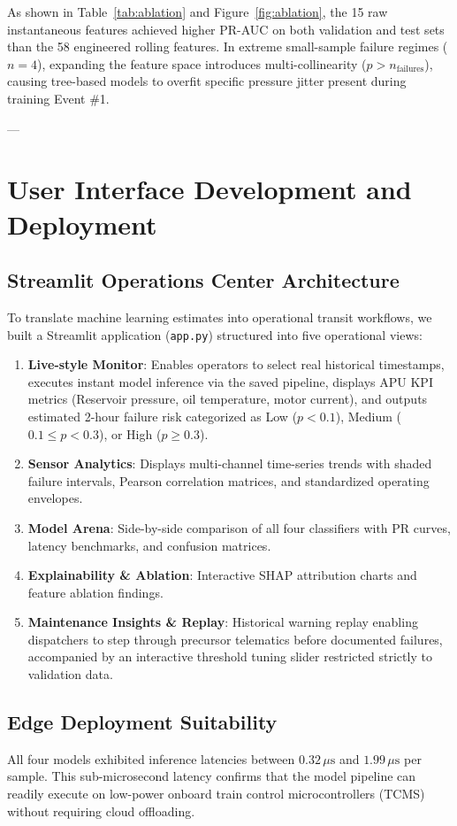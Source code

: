 \documentclass[10pt,twocolumn,a4paper]{article}
\begin{document}
As shown in Table~\ref{tab:ablation} and Figure~\ref{fig:ablation}, the 15 raw instantaneous features achieved higher PR-AUC on both validation and test sets than the 58 engineered rolling features. In extreme small-sample failure regimes ($n=4$), expanding the feature space introduces multi-collinearity ($p > n_{\text{failures}}$), causing tree-based models to overfit specific pressure jitter present during training Event \#1.

---

\section{User Interface Development and Deployment}

\subsection{Streamlit Operations Center Architecture}
To translate machine learning estimates into operational transit workflows, we built a Streamlit application (\texttt{app.py}) structured into five operational views:
\begin{enumerate}
    \item \textbf{Live-style Monitor}: Enables operators to select real historical timestamps, executes instant model inference via the saved pipeline, displays APU KPI metrics (Reservoir pressure, oil temperature, motor current), and outputs estimated 2-hour failure risk categorized as Low ($p < 0.1$), Medium ($0.1 \le p < 0.3$), or High ($p \ge 0.3$).
    \item \textbf{Sensor Analytics}: Displays multi-channel time-series trends with shaded failure intervals, Pearson correlation matrices, and standardized operating envelopes.
    \item \textbf{Model Arena}: Side-by-side comparison of all four classifiers with PR curves, latency benchmarks, and confusion matrices.
    \item \textbf{Explainability \& Ablation}: Interactive SHAP attribution charts and feature ablation findings.
    \item \textbf{Maintenance Insights \& Replay}: Historical warning replay enabling dispatchers to step through precursor telematics before documented failures, accompanied by an interactive threshold tuning slider restricted strictly to validation data.
\end{enumerate}

\subsection{Edge Deployment Suitability}
All four models exhibited inference latencies between $0.32\,\mu\text{s}$ and $1.99\,\mu\text{s}$ per sample. This sub-microsecond latency confirms that the model pipeline can readily execute on low-power onboard train control microcontrollers (TCMS) without requiring cloud offloading.
\end{document}
